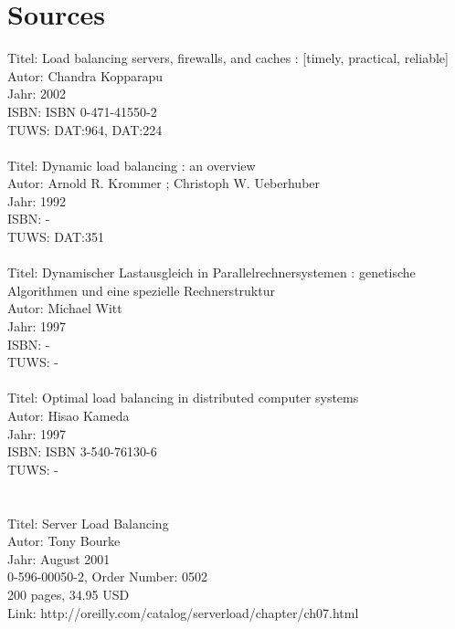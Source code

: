 \documentclass[12p]{article}
\begin{document}
	\newpage
	
	
	
	\newpage
	\section{Sources}
	Titel:    Load balancing servers, firewalls, and caches : [timely, practical, reliable]\\
	Autor:    Chandra Kopparapu\\
	Jahr:    2002\\
	ISBN:    ISBN 0-471-41550-2\\
	TUWS:    DAT:964, DAT:224\\
	\\
	Titel:    Dynamic load balancing : an overview\\
	Autor:    Arnold R. Krommer ; Christoph W. Ueberhuber\\
	Jahr:    1992\\
	ISBN:     -\\
	TUWS:    DAT:351\\
	\\
	Titel:    Dynamischer Lastausgleich in Parallelrechnersystemen : genetische Algorithmen und eine spezielle Rechnerstruktur\\
	Autor:    Michael Witt\\
	Jahr:    1997\\
	ISBN:    -\\
	TUWS:    -\\
	\\
	Titel:    Optimal load balancing in distributed computer systems\\
	Autor:    Hisao Kameda\\
	Jahr:    1997\\
	ISBN:    ISBN 3-540-76130-6\\
	TUWS:     -\\
	\\
	\\
	Titel:     Server Load Balancing\\
	Autor:     Tony Bourke\\
	Jahr:     August 2001\\
	0-596-00050-2, Order Number: 0502\\
	200 pages, 34.95 USD\\
	Link: http://oreilly.com/catalog/serverload/chapter/ch07.html\\
\end{document}
